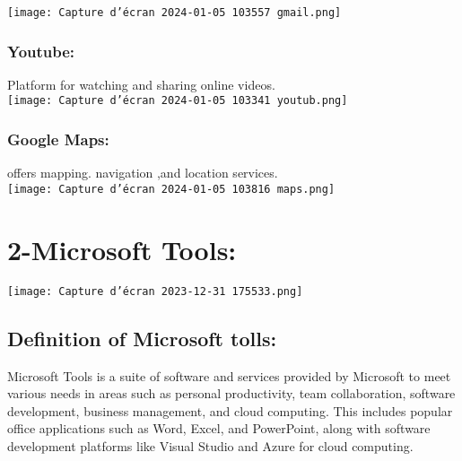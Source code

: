 \documentclass[a4paper,11pt]{report}
\begin{document}
\texttt{[image: Capture d’écran 2024-01-05 103557 gmail.png]}

\subsection{Youtube:}
Platform for watching and sharing online videos.\\

\texttt{[image: Capture d’écran 2024-01-05 103341 youtub.png]}

\subsection{ Google Maps:}
offers mapping. navigation ,and location services.\\

\texttt{[image: Capture d’écran 2024-01-05 103816 maps.png]}

\clearpage
\chapter{2-Microsoft Tools:}
\texttt{[image: Capture d’écran 2023-12-31 175533.png]}
\section{Definition of Microsoft tolls:}
Microsoft Tools is a suite of software and services provided by Microsoft to meet various needs in areas such as personal productivity, team collaboration, software development, business management, and cloud computing. This includes popular office applications such as Word, Excel, and PowerPoint, along with software development platforms like Visual Studio and Azure for cloud computing.\\
\clearpage
\end{document}
